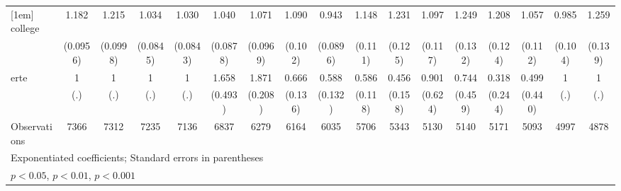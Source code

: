 {\begin{tabular}{l*{16}{c}}
[1em]
college             &       1.182\sym{*}  &       1.215\sym{*}  &       1.034         &       1.030         &       1.040         &       1.071         &       1.090         &       0.943         &       1.148         &       1.231\sym{*}  &       1.097         &       1.249\sym{*}  &       1.208         &       1.057         &       0.985         &       1.259\sym{*}  \\
                    &    (0.0956)         &    (0.0998)         &    (0.0845)         &    (0.0843)         &    (0.0878)         &    (0.0969)         &     (0.102)         &    (0.0896)         &     (0.111)         &     (0.125)         &     (0.117)         &     (0.132)         &     (0.124)         &     (0.112)         &     (0.104)         &     (0.139)         \\
[1em]
erte                &           1         &           1         &           1         &           1         &       1.658         &       1.871\sym{***}&       0.666\sym{*}  &       0.588\sym{*}  &       0.586\sym{**} &       0.456\sym{*}  &       0.901         &       0.744         &       0.318         &       0.499         &           1         &           1         \\
                    &         (.)         &         (.)         &         (.)         &         (.)         &     (0.493)         &     (0.208)         &     (0.136)         &     (0.132)         &     (0.118)         &     (0.158)         &     (0.624)         &     (0.459)         &     (0.244)         &     (0.440)         &         (.)         &         (.)         \\
\hline
Observations        &        7366         &        7312         &        7235         &        7136         &        6837         &        6279         &        6164         &        6035         &        5706         &        5343         &        5130         &        5140         &        5171         &        5093         &        4997         &        4878         \\
\hline\hline
\multicolumn{17}{l}{\footnotesize Exponentiated coefficients; Standard errors in parentheses}\\
\multicolumn{17}{l}{\footnotesize \sym{*} \(p<0.05\), \sym{**} \(p<0.01\), \sym{***} \(p<0.001\)}\\
\end{tabular}
}
